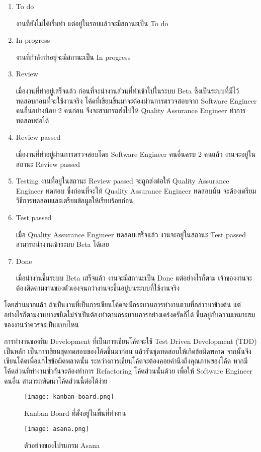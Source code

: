 \begin{enumerate}
	\item To do
	
	งานที่ยังไม่ได้เริ่มทำ แต่อยู่ในรอบแล้วจะมีสถานะเป็น To do
	
	\item In progress
	
	งานที่กำลังทำอยู่จะมีสถานะเป็น In progress
	
	\item Review
	
	เมื่องานที่ทำอยู่เสร็จแล้ว ก่อนที่จะนำงานส่วนที่ทำเข้าไปในระบบ Beta ซึ่งเป็นระบบที่มีไว้ทดสอบก่อนที่จะใช้งานจริง โค้ดที่เขียนขึ้นมาจะต้องผ่านการตรวจสอบจาก Software Engineer คนอื่นอย่างน้อย 2 คนก่อน จึงจะสามารถส่งไปให้ Quality Assurance Engineer ทำการทดสอบต่อได้
	
	\item Review passed
	
	เมื่องานที่ทำอยู่ผ่านการตรวจสอบโดย Software Engineer คนอื่นครบ 2 คนแล้ว งานจะอยู่ในสถานะ Review passed 
	
	\item Testing
	งานที่อยู่ในสถานะ Review passed จะถูกส่งต่อให้ Quality Assurance Engineer ทดสอบ ซึ่งก่อนที่จะให้ Quality Assurance Engineer ทดสอบนั้น จะต้องเตรียมวิธีการทดสอบและเตรียมข้อมูลให้เรียบร้อยก่อน
	
	\item Test passed
	
	เมื่อ Quality Assurance Engineer ทดสอบเสร็จแล้ว งานจะอยู่ในสถานะ Test passed สามารถนำงานเข้าระบบ Beta ได้เลย
	
	\item Done
	
	เมื่อนำงานขึ้นระบบ Beta เสร็จแล้ว งานจะมีสถานะเป็น Done แต่อย่างไรก็ตาม เจ้าของงานจะต้องติดตามงานของตัวเองจนกว่างานจะขึ้นอยู่บนระบบที่ใช้งานจริง
\end{enumerate}

โดยส่วนมากแล้ว ถ้าเป็นงานที่เป็นการเขียนโค้ดจะมีกระบวนการทำงานตามที่กล่าวมาข้างต้น แต่อย่างไรก็ตามงานบางชนิดไม่จำเป็นต้องทำตามกระบวนการอย่างเคร่งครัดก็ได้ ขึ้นอยู่กับความเหมาะสมของงานว่าควรจะเป็นแบบไหน

การทำงานของทีม Development ที่เป็นการเขียนโค้ดจะใช้ Test Driven Development (TDD) เป็นหลัก เป็นการเขียนชุดทดสอบของโค้ดขึ้นมาก่อน แล้วรันชุดทดสอบให้เกิดข้อผิดพลาด จากนั้นจึงเขียนโค้ดเพื่อแก้ไขข้อผิดพลาดนั้น ระหว่างการเขียนโค้ดจะต้องคอยคำนึงถึงคุณภาพของโค้ด หากมีโค้ดส่วนที่ทำงานซ้ำกันจะต้องทำการ Refactoring โค้ดส่วนนั้นด้วย เพื่อให้ Software Engineer คนอื่น สามารถพัฒนาโค้ดส่วนนี้ต่อได้ง่าย

\begin{figure}[!h]
	\centering
	\texttt{[image: kanban-board.png]}  
	\caption{Kanban Board ที่ตั้งอยู่ในพื้นที่ทำงาน}
	\label{Fig:kanban-board}
\end{figure}

\begin{figure}[!h]
	\centering
	\texttt{[image: asana.png]}  
	\caption{ตัวอย่างของโปรแกรม Asana}
	\label{Fig:asana}
\end{figure}